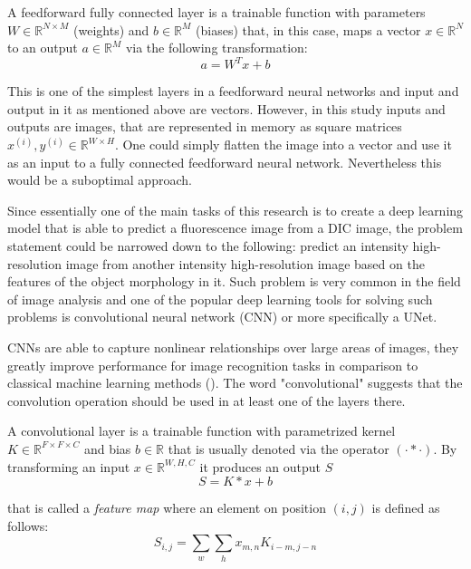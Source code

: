 \begin{definition}
	A feedforward fully connected layer is a trainable function with parameters $W \in \mathbb{R}^{N \times M}$ (weights) and $b \in \mathbb{R}^{M}$ (biases) that, in this case, maps a vector $x \in \mathbb{R}^{N}$ to an output $a \in \mathbb{R}^{M}$ via the following transformation:
		\begin{equation}
			a = W^{T}x + b
		\end{equation}
\end{definition}

This is one of the simplest layers in a feedforward neural networks and input and output in it as mentioned above are vectors. However, in this study inputs and outputs are images, that are represented in memory as square matrices $x^{(i)}, y^{(i)} \in \mathbb{R}^{W \times H}$. One could simply flatten the image into a vector and use it as an input to a fully connected feedforward neural network. Nevertheless this would be a suboptimal approach. 

Since essentially one of the main tasks of this research is to create a deep learning model that is able to predict a fluorescence image from a DIC image, the problem statement could be narrowed down to the following: predict an intensity high-resolution image from another intensity high-resolution image based on the features of the object morphology in it. Such problem is very common in the field of image analysis and one of the popular deep learning tools for solving such problems is convolutional neural network (CNN) or more specifically a UNet.

CNNs are able to capture nonlinear relationships over large areas of images, they greatly improve performance for image recognition tasks in comparison to classical machine learning methods (\cite{Ounkomol_2018}). The word "convolutional" suggests that the convolution operation should be used in at least one of the layers there.  

\begin{definition}
	A convolutional layer is a trainable function with parametrized kernel $K \in \mathbb{R}^{F \times F \times C}$ and bias $b \in \mathbb{R}$ that is usually denoted via the operator $(\cdot * \cdot)$. By transforming an input $x \in \mathbb{R}^{W, H, C}$ it produces an output $S$
	\begin{equation}
		S = K * x + b
	\end{equation}

	that is called a \textit{feature map} where an element on position $(i, j)$ is defined as follows:
		\begin{equation}
			S_{i, j} = \sum_{w} \sum_{h} x_{m, n}  K_{i - m, j - n}
		\end{equation}
\end{definition}


